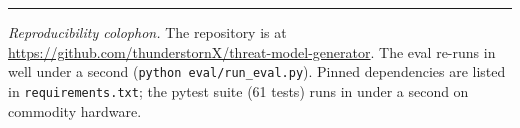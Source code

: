 \documentclass[conference]{IEEEtran}
\begin{document}
\vspace{2mm}
\noindent\rule{\linewidth}{0.4pt}

\noindent\textit{Reproducibility colophon.} The repository is at
\url{https://github.com/thunderstornX/threat-model-generator}. The
eval re-runs in well under a second
(\texttt{python eval/run\_eval.py}). Pinned dependencies are listed
in \texttt{requirements.txt}; the pytest suite (61 tests) runs in
under a second on commodity hardware.
\end{document}
